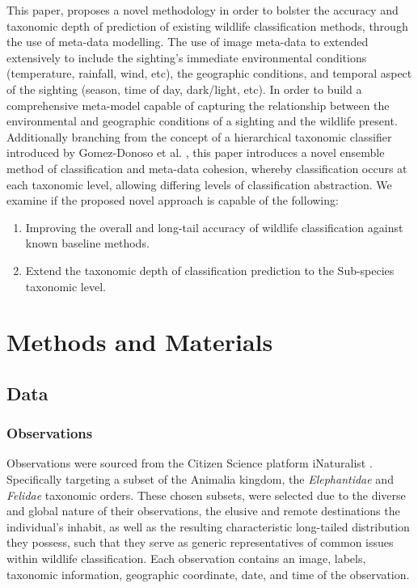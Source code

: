 \documentclass[conference]{IEEEtran}
\begin{document}
    This paper, proposes a novel methodology in order to bolster the accuracy and taxonomic depth of prediction of existing wildlife classification methods, through the use of meta-data modelling. 
    The use of image meta-data to extended extensively to include the sighting's immediate environmental conditions (temperature, rainfall, wind, etc), the geographic conditions, and temporal aspect of the sighting (season, time of day, dark/light, etc). In order to build a comprehensive meta-model capable of capturing the relationship between the environmental and geographic conditions of a sighting and the wildlife present.
    Additionally branching from the concept of a hierarchical taxonomic classifier introduced by Gomez-Donoso et al. \cite{gomez-donoso_escalona_pérez-esteve_cazorla_2021}, this paper introduces a novel ensemble method of classification and meta-data cohesion, whereby classification occurs at each taxonomic level, allowing differing levels of classification abstraction. 
    We examine if the proposed novel approach is capable of the following: 
    \\
    
    \begin{enumerate}
        \item Improving the overall and long-tail accuracy of wildlife classification against known baseline methods. 
        \item Extend the taxonomic depth of classification prediction to the Sub-species taxonomic level.
    \end{enumerate}


    
\section{Methods and Materials}
    \subsection{Data}
        \subsubsection{Observations}
        Observations were sourced from the Citizen Science platform iNaturalist \cite{iNaturalist}. Specifically targeting a subset of the Animalia kingdom, the \textit{Elephantidae} and \textit{Felidae} taxonomic orders. These chosen subsets, were selected due to the diverse and global nature of their observations, the elusive and remote destinations the individual's inhabit, as well as the resulting characteristic long-tailed distribution they possess, such that they serve as generic representatives of common issues within wildlife classification. Each observation contains an image, labels, taxonomic information, geographic coordinate, date, and time of the observation.
    
\end{document}
